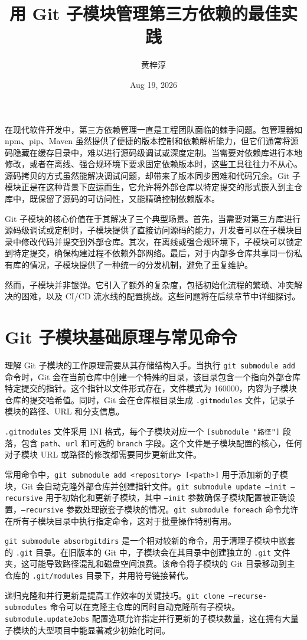 \title{用 Git 子模块管理第三方依赖的最佳实践}
\author{黄梓淳}
\date{Aug 19, 2026}
\maketitle
在现代软件开发中，第三方依赖管理一直是工程团队面临的棘手问题。包管理器如 npm、pip、Maven 虽然提供了便捷的版本控制和依赖解析能力，但它们通常将源码隐藏在缓存目录中，难以进行源码级调试或深度定制。当需要对依赖库进行本地修改，或者在离线、强合规环境下要求固定依赖版本时，这些工具往往力不从心。源码拷贝的方式虽然能解决调试问题，却带来了版本同步困难和代码冗余。Git 子模块正是在这种背景下应运而生，它允许将外部仓库以特定提交的形式嵌入到主仓库中，既保留了源码的可访问性，又能精确控制依赖版本。\par
Git 子模块的核心价值在于其解决了三个典型场景。首先，当需要对第三方库进行源码级调试或定制时，子模块提供了直接访问源码的能力，开发者可以在子模块目录中修改代码并提交到外部仓库。其次，在离线或强合规环境下，子模块可以锁定到特定提交，确保构建过程不依赖外部网络。最后，对于内部多仓库共享同一份私有库的情况，子模块提供了一种统一的分发机制，避免了重复维护。\par
然而，子模块并非银弹。它引入了额外的复杂度，包括初始化流程的繁琐、冲突解决的困难，以及 CI/CD 流水线的配置挑战。这些问题将在后续章节中详细探讨。\par
\chapter{Git 子模块基础原理与常见命令}
理解 Git 子模块的工作原理需要从其存储结构入手。当执行 \texttt{git submodule add} 命令时，Git 会在当前仓库中创建一个特殊的目录，该目录包含一个指向外部仓库特定提交的指针。这个指针以文件形式存在，文件模式为 160000，内容为子模块仓库的提交哈希值。同时，Git 会在仓库根目录生成 \texttt{.gitmodules} 文件，记录子模块的路径、URL 和分支信息。\par
\texttt{.gitmodules} 文件采用 INI 格式，每个子模块对应一个 \texttt{[submodule "路径"]} 段落，包含 \texttt{path}、\texttt{url} 和可选的 \texttt{branch} 字段。这个文件是子模块配置的核心，任何对子模块 URL 或路径的修改都需要同步更新此文件。\par
常用命令中，\texttt{git submodule add <repository> [<path>]} 用于添加新的子模块，Git 会自动克隆外部仓库并创建指针文件。\texttt{git submodule update --init --recursive} 用于初始化和更新子模块，其中 \texttt{--init} 参数确保子模块配置被正确设置，\texttt{--recursive} 参数处理嵌套子模块的情况。\texttt{git submodule foreach} 命令允许在所有子模块目录中执行指定命令，这对于批量操作特别有用。\par
\texttt{git submodule absorbgitdirs} 是一个相对较新的命令，用于清理子模块中嵌套的 \texttt{.git} 目录。在旧版本的 Git 中，子模块会在其目录中创建独立的 \texttt{.git} 文件夹，这可能导致路径混乱和磁盘空间浪费。该命令将子模块的 Git 目录移动到主仓库的 \texttt{.git/modules} 目录下，并用符号链接替代。\par
递归克隆和并行更新是提高工作效率的关键技巧。\texttt{git clone --recurse-submodules} 命令可以在克隆主仓库的同时自动克隆所有子模块。\texttt{submodule.updateJobs} 配置选项允许指定并行更新的子模块数量，这在拥有大量子模块的大型项目中能显著减少初始化时间。\par
